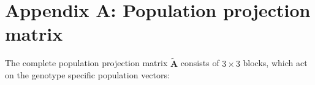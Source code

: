 \documentclass[11pt]{article}
\def\mbf#1{\mathbf{#1}}
\begin{document}
%
%
%
%
%

\section*{Appendix A: Population projection matrix}
\renewcommand{\theequation}{A\arabic{equation}}
\setcounter{equation}{0}  %
\setcounter{table}{0}  %

The complete population projection matrix $\tilde{\mbf{A}}$ consists of $3 \times 3$ blocks, which act on the genotype specific population vectors:
\end{document}
